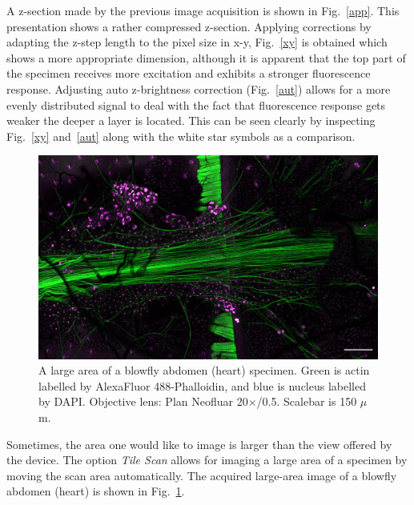 A z-section made by the previous image acquisition is shown in Fig.~\ref{app}. 
This presentation shows a rather compressed z-section. 
Applying corrections by adapting the z-step length to the pixel size in x-y, Fig.~\ref{xy} is obtained which shows a more appropriate dimension, although it is apparent that the top part of the specimen receives more excitation and exhibits a stronger fluorescence response. 
Adjusting auto z-brightness correction (Fig.~\ref{aut}) allows for a more evenly distributed signal to deal with the fact that fluorescence response gets weaker the deeper a layer is located. 
This can be seen clearly by inspecting Fig.~\ref{xy} and~\ref{aut} along with the white star symbols as a comparison.

\begin{figure}[h!]
\centering
\includegraphics[width=0.8\columnwidth]{Exp_3_LSM/Figures/MS3/F5mg_150um}	
\caption{ A large area of a blowfly abdomen (heart) specimen. 
Green is actin labelled by AlexaFluor 488-Phalloidin, and blue is nucleus labelled by DAPI. 
Objective lens: Plan Neofluar 20$\times$/0.5. 
Scalebar is 150 $\mu$m.}
\label{fig:bloabdo}
\end{figure}

Sometimes, the area one would like to image is larger than the view offered by the device. 
The option \textit{Tile Scan} allows for imaging a large area of a specimen by moving the scan area automatically. 
The acquired large-area image of a blowfly abdomen (heart) is shown in Fig.~\ref{fig:bloabdo}.

